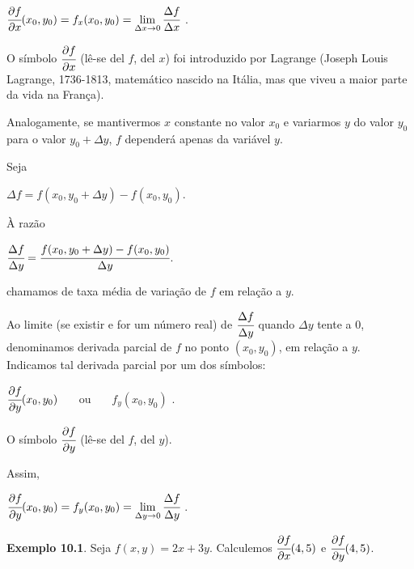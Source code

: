 		\bigskip

		{\LARGE $\cfrac{\partial f}{\partial x} (x_{0}, y_{0}) = f_{x}(x_{0}, y_{0}) = \lim \limits_{\Delta x \to 0} \cfrac{\Delta f}{\Delta x}$} .

		\bigskip

		O símbolo $\cfrac{\partial f}{\partial x}$ (lê-se del $f$, del $x$) foi introduzido por Lagrange (Joseph Louis Lagrange, 1736-1813, matemático nascido na Itália, mas que viveu a maior parte da vida na França).

		Analogamente, se mantivermos $x$ constante no valor $x_{0}$ e variarmos $y$ do valor $y_{0}$ para o valor $y_{0} + \Delta y$, $f$ dependerá apenas da variável $y$.

		\medskip

		Seja

		\bigskip

		$\Delta f = f(x_{0}, y_{0} + \Delta y) - f(x_{0}, y_{0})$.

		\bigskip

		À razão
		
		\bigskip
		
		$\cfrac{\Delta f}{\Delta y} = \cfrac{f(x_{0}, y_{0} + \Delta y) - f(x_{0}, y_{0})}{\Delta y}$.

		\bigskip

		chamamos de taxa média de variação de $f$ em relação a $y$.

		Ao limite (se existir e for um número real) de $\cfrac{\Delta f}{\Delta y}$ quando $\Delta y$ tente a $0$, denominamos derivada parcial de $f$ no ponto $(x_{0}, y_{0})$, em relação a $y$. Indicamos tal derivada parcial por um dos símbolos:

		\bigskip

		$\cfrac{\partial f}{\partial y} (x_{0}, y_{0})$ \ \ \ ou \ \ \ $f_{y}(x_{0}, y_{0})$ .

		\bigskip

		O símbolo $\cfrac{\partial f}{\partial y}$ (lê-se del $f$, del $y$).

		\bigskip

		Assim,

		\bigskip

		{\LARGE $\cfrac{\partial f}{\partial y} (x_{0}, y_{0}) = f_{y}(x_{0}, y_{0}) = \lim \limits_{\Delta y \to 0} \cfrac{\Delta f}{\Delta y}$} .

		\bigskip

		\textbf{Exemplo 10.1}. Seja $f(x, y) = 2x +3y$. Calculemos $\cfrac{\partial f}{\partial x} (4, 5)$ e $\cfrac{\partial f}{\partial y} (4, 5)$.

